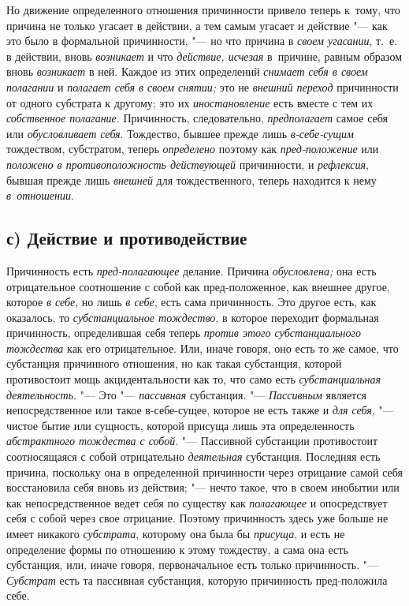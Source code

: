 Но движение определенного отношения причинности привело теперь к~тому, что
причина не только угасает в действии, а тем самым угасает и действие "--- как
это было в формальной причинности, "--- но что причина в {\em своем угасании},
т.~е. в действии, вновь {\em возникает} и что {\em действие, исчезая}
в~причине, равным образом вновь {\em возникает} в ней. Каждое из этих определений
{\em снимает себя в своем полагании} и {\em полагает себя в своем снятии;} это
не {\em внешний переход} причинности от одного субстрата к другому; это их
{\em иностановление} есть вместе с тем их {\em собственное полагание}.
Причинность, следовательно, {\em предполагает} самое себя или
{\em обусловливает себя}. Тождество, бывшее прежде лишь {\em в-себе-сущим}
тождеством, субстратом, теперь {\em определено} поэтому как
{\em пред-положение} или {\em положено в противоположность действующей}
причинности, и {\em рефлексия}, бывшая прежде лишь {\em внешней} для
тождественного, теперь находится к нему {\em в~отношении}.

\subsection[с) Действие и противодействие]{с) Действие и противодействие}

Причинность есть {\em пред-полагающее} делание. Причина {\em обусловлена;} она
есть отрицательное соотношение с собой как пред-положенное, как внешнее другое,
которое {\em в себе}, но лишь {\em в себе}, есть сама причинность. Это другое
есть, как оказалось, то {\em субстанциальное тождество}, в которое переходит
формальная причинность, определившая себя теперь {\em против этого
субстанциального тождества} как его отрицательное. Или, иначе говоря, оно есть
то же самое, что субстанция причинного отношения, но как такая субстанция,
которой противостоит мощь акцидентальности как то, что само есть
{\em субстанциальная деятельность}. "--- Это "--- {\em пассивная} субстанция.
"--- {\em Пассивным} является непосредственное или такое в-себе-сущее, которое
не есть также и {\em для себя}, "--- чистое бытие или сущность, которой присуща
лишь эта определенность {\em абстрактного тождества с собой}. "--- Пассивной
субстанции противостоит соотносящаяся с собой отрицательно {\em деятельная}
субстанция. Последняя есть причина, поскольку она в определенной причинности
через отрицание самой себя восстановила себя вновь из действия; "--- нечто
такое, что в своем инобытии или как непосредственное ведет себя по существу как
{\em полагающее} и опосредствует себя с собой через свое отрицание. Поэтому
причинность здесь уже больше не имеет никакого {\em субстрата}, которому она
была бы {\em присуща}, и есть не определение формы по отношению к этому
тождеству, а сама она есть субстанция, или, иначе говоря, первоначальное есть
только причинность. "--- {\em Субстрат} есть та пассивная субстанция, которую
причинность пред-положила себе.

